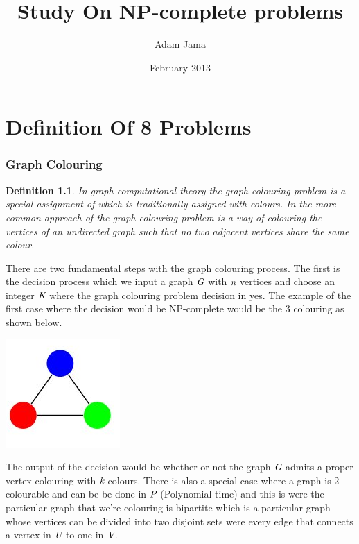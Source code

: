 \documentclass[a4paper]{report}
\newtheorem{mydef}{Definition}
\begin{document}
\title{Study On NP-complete problems}
\author{Adam Jama}
\date{February 2013}

\maketitle


\chapter{Definition Of 8 Problems}

\subsection{Graph Colouring}
\begin{mydef}
In graph computational theory the graph colouring problem is a special assignment of which is traditionally assigned with colours. In the more common approach of the graph colouring problem is a way of colouring the vertices of an undirected graph such that no two adjacent vertices share the same colour.
\end{mydef}

There are two fundamental steps with the graph colouring process. The first is the decision process which we input a graph $\emph{G}$ with $\emph{n}$ vertices and choose an integer $\emph{K}$ where the graph colouring problem decision in yes. The example of the first case where the decision would be NP-complete would be the 3 colouring as shown below.



\begin{center}
\includegraphics[scale=0.77]{3colouring.png}
\end{center}

The output of the decision would be whether or not the graph $\emph{G}$ admits a proper vertex colouring with $\emph{k}$ colours. There is also a special case where a graph is 2 colourable and can be be done in $\emph{P}$ (Polynomial-time) and this is were the particular graph that we're colouring is bipartite which is a particular graph whose vertices can be divided into two disjoint sets were every edge that connects a vertex in $\emph{U}$ to one in $\emph{V}$.
\end{document}

